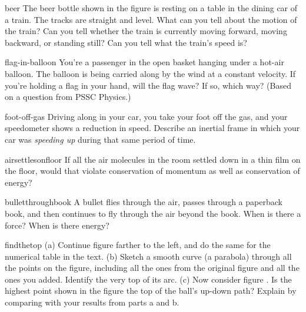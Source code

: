 \begin{hwsection}

\begin{hw}{beer}
The beer bottle shown in the figure is resting on a table in the dining car of a train.
The tracks are straight and level. What can you tell about the motion of the
train? Can you tell whether the train is currently moving forward, moving backward,
or standing still? Can you tell what the train's speed is?
\end{hw}

\begin{hw}{flag-in-balloon}
You're a passenger in the open basket hanging under a hot-air balloon.
The balloon is being carried along by the wind at a constant velocity.
If you're holding a flag in your hand, will the flag wave? If so,
which way? (Based on a question from PSSC Physics.)
\end{hw}

\begin{hw}{foot-off-gas}
Driving along in your car, you take your foot off the gas, and your speedometer
shows a reduction in speed. Describe an inertial frame in which your car
was \emph{speeding up} during that same period of time.
\end{hw}

\begin{hw}{airsettlesonfloor}
If all the air molecules in the room settled down in a thin film on the floor,
would that violate conservation of momentum as well as conservation of energy?
\end{hw}

\begin{hw}{bulletthroughbook}
A bullet flies through the air, passes through a
paperback book, and then continues to fly through the air
beyond the book. When is there a force? When is there energy?
\end{hw}

\begin{hw}{findthetop}
(a) Continue figure  farther to the left, and do the
same for the numerical table in the text.\hwendpart
(b) Sketch a smooth curve (a parabola) through all the points on the figure, including all
the ones from the original figure and all the ones you added. Identify the very top of
its arc.\hwendpart
(c) Now consider figure . Is the highest point shown in the figure the
top of the ball's up-down path? Explain by comparing with your results from parts a and b.
\end{hw}


\end{hwsection}
